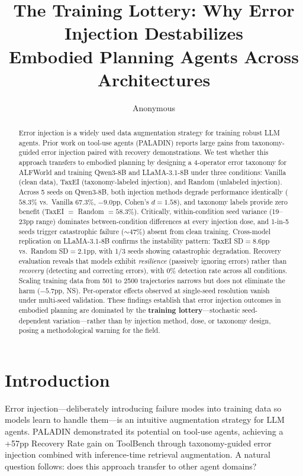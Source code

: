 \documentclass[11pt,a4paper]{article}
\title{The Training Lottery: Why Error Injection Destabilizes\\Embodied Planning Agents Across Architectures}
\author{Anonymous}
\begin{document}
\maketitle

\begin{abstract}
Error injection is a widely used data augmentation strategy for training robust LLM agents.
Prior work on tool-use agents (PALADIN) reports large gains from taxonomy-guided error injection paired with recovery demonstrations.
We test whether this approach transfers to embodied planning by designing a 4-operator error taxonomy for ALFWorld and training Qwen3-8B and LLaMA-3.1-8B under three conditions: Vanilla (clean data), TaxEI (taxonomy-labeled injection), and Random (unlabeled injection).
Across 5 seeds on Qwen3-8B, both injection methods degrade performance identically ($58.3\%$ vs.\ Vanilla $67.3\%$, $-9.0$pp, Cohen's $d{=}1.58$), and taxonomy labels provide zero benefit (TaxEI $=$ Random $= 58.3\%$).
Critically, within-condition seed variance (19--23pp range) dominates between-condition differences at every injection dose, and 1-in-5 seeds trigger catastrophic failure (${\sim}47\%$) absent from clean training.
Cross-model replication on LLaMA-3.1-8B confirms the instability pattern: TaxEI SD${=}8.6$pp vs.\ Random SD${=}2.1$pp, with 1/3 seeds showing catastrophic degradation.
Recovery evaluation reveals that models exhibit \emph{resilience} (passively ignoring errors) rather than \emph{recovery} (detecting and correcting errors), with 0\% detection rate across all conditions.
Scaling training data from 501 to 2500 trajectories narrows but does not eliminate the harm ($-5.7$pp, NS).
Per-operator effects observed at single-seed resolution vanish under multi-seed validation.
These findings establish that error injection outcomes in embodied planning are dominated by the \textbf{training lottery}---stochastic seed-dependent variation---rather than by injection method, dose, or taxonomy design, posing a methodological warning for the field.
\end{abstract}

\section{Introduction}
\label{sec:intro}

Error injection---deliberately introducing failure modes into training data so models learn to handle them---is an intuitive augmentation strategy for LLM agents.
PALADIN \cite{paladin2025} demonstrated its potential on tool-use agents, achieving a +57pp Recovery Rate gain on ToolBench through taxonomy-guided error injection combined with inference-time retrieval augmentation.
A natural question follows: does this approach transfer to other agent domains?
\end{document}

